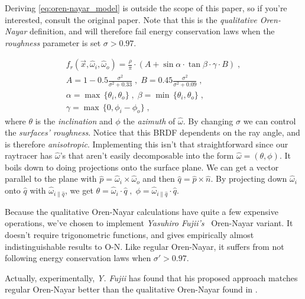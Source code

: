 \documentclass[a4paper, twocolumn]{article}
\begin{document}
                Deriving \cref{eq:oren-nayar_model} is outside the scope of this paper, so if you're interested, consult the original paper. Note that this is the \emph{qualitative Oren-Nayar} definition, and will therefore fail energy conservation laws when the \emph{roughness} parameter is set \(\sigma > 0.97\).

                \begin{equation} \label{eq:oren-nayar_model}
                    \begin{split}
                        f_r(\vec{x}, \hat{\omega}_i, \hat{\omega}_o) = \frac{\rho}{\pi} \cdot (A + \sin\alpha \cdot \tan\beta \cdot \gamma \cdot B) \; ,\\
                        A = 1 - 0.5 \frac{\sigma^2}{\sigma^2 + 0.33} \; , \; B = 0.45\frac{\sigma^2}{\sigma^2 + 0.09} \; ,\\
                        \alpha = \max\, \{\theta_i, \theta_o\} \; , \; \beta = \min\, \{\theta_i, \theta_o\} \; ,\\
                        \gamma = \max\, \{0, \phi_i - \phi_o\} \; ,
                    \end{split}
                \end{equation} where \(\theta\) is the \emph{inclination} and \(\phi\) the \emph{azimuth} of \(\hat{\omega}\). By changing \(\sigma\) we can control the \emph{surfaces' roughness}. Notice that this BRDF dependents on the ray angle, and is therefore \emph{anisotropic}. Implementing this isn't that straightforward since our raytracer has \(\hat{\omega}\)'s that aren't easily decomposable into the form \(\hat{\omega} = (\theta, \phi)\). It boils down to doing projections onto the surface plane. We can get a vector parallel to the plane with \(\hat{p} = \hat{\omega}_i \times \hat{\omega}_o\) and then \(\hat{q} = \hat{p} \times \hat{n}\). By projecting down \(\hat{\omega}_i\) onto \(\hat{q}\) with \(\hat{\omega}_{i\parallel \hat{q}}\), we get \(\theta = \hat{\omega}_i \cdot \hat{q} \; , \; \phi = \hat{\omega}_{i\parallel \hat{q}} \cdot \hat{q}\).

                Because the qualitative Oren-Nayar calculations have quite a few expensive operations, we've chosen to implement \emph{Yasuhiro Fujii's}~\cite{fujii2015improvement} Oren-Nayar variant. It doesn't require trigonometric functions, and gives empirically almost indistinguishable results to O-N. Like regular Oren-Nayar, it suffers from not following energy conservation laws when \(\sigma' > 0.97\).

                Actually, experimentally, \emph{Y. Fujii} has found that his proposed approach matches regular Oren-Nayar better than the qualitative Oren-Nayar found in \cite{oren1994generalization}.
\end{document}
